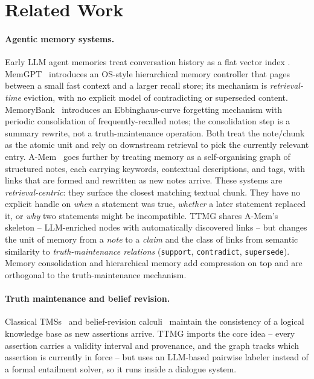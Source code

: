 \section{Related Work}
\label{sec:related}

\paragraph{Agentic memory systems.}
Early LLM agent memories treat conversation history as a flat vector
index \citep{mem0,longrag}. MemGPT~\citep{memgpt} introduces an
OS-style hierarchical memory controller that pages between a small
fast context and a larger recall store; its mechanism is
\emph{retrieval-time} eviction, with no explicit model of
contradicting or superseded content. MemoryBank~\citep{memorybank}
introduces an Ebbinghaus-curve forgetting mechanism with periodic
consolidation of frequently-recalled notes; the consolidation step
is a summary rewrite, not a truth-maintenance operation. Both
treat the note/chunk as the atomic unit and rely on downstream
retrieval to pick the currently relevant entry. A-Mem~\citep{amem}
goes further by treating memory as a self-organising graph of
structured notes, each carrying keywords, contextual descriptions,
and tags, with links that are formed and rewritten as new notes
arrive. These systems are \emph{retrieval-centric}: they surface
the closest matching textual chunk. They have no explicit handle on
\emph{when} a statement was true, \emph{whether} a later statement
replaced it, or \emph{why} two statements might be incompatible.
TTMG shares A-Mem's skeleton -- LLM-enriched nodes with
automatically discovered links -- but changes the unit of memory
from a \emph{note} to a \emph{claim} and the class of links from
semantic similarity to \emph{truth-maintenance relations}
(\texttt{support}, \texttt{contradict}, \texttt{supersede}).
Memory consolidation \citep{memoria} and hierarchical memory
\citep{hippocampal} add compression on top and are orthogonal to
the truth-maintenance mechanism.

\paragraph{Truth maintenance and belief revision.}
Classical TMSs~\citep{tms_doyle,atms_dekleer} and belief-revision
calculi~\citep{agm,nonmonotonic} maintain the consistency of a
logical knowledge base as new assertions arrive. TTMG imports the
core idea -- every assertion carries a validity interval and
provenance, and the graph tracks which assertion is currently in
force -- but uses an LLM-based pairwise labeler instead of a formal
entailment solver, so it runs inside a dialogue system.

